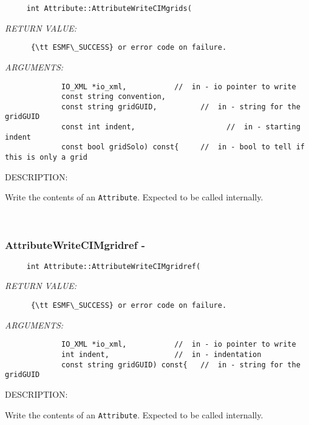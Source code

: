   
\begin{verbatim}     int Attribute::AttributeWriteCIMgrids(\end{verbatim}{\em RETURN VALUE:}
\begin{verbatim}      {\tt ESMF\_SUCCESS} or error code on failure.\end{verbatim}{\em ARGUMENTS:}
\begin{verbatim}             IO_XML *io_xml,           //  in - io pointer to write
             const string convention,
             const string gridGUID,          //  in - string for the gridGUID
             const int indent,                     //  in - starting indent
             const bool gridSolo) const{     //  in - bool to tell if this is only a grid\end{verbatim}
{\sf DESCRIPTION:\\ }


      Write the contents of an {\tt Attribute}.  Expected to be
      called internally.
   
 
\mbox{}\hrulefill\
 
\subsubsection [AttributeWriteCIMgridref] {AttributeWriteCIMgridref -}


  
\begin{verbatim}     int Attribute::AttributeWriteCIMgridref(\end{verbatim}{\em RETURN VALUE:}
\begin{verbatim}      {\tt ESMF\_SUCCESS} or error code on failure.\end{verbatim}{\em ARGUMENTS:}
\begin{verbatim}             IO_XML *io_xml,           //  in - io pointer to write
             int indent,               //  in - indentation
             const string gridGUID) const{   //  in - string for the gridGUID\end{verbatim}
{\sf DESCRIPTION:\\ }


      Write the contents of an {\tt Attribute}.  Expected to be
      called internally.
   
 
\mbox{}\hrulefill\
 
